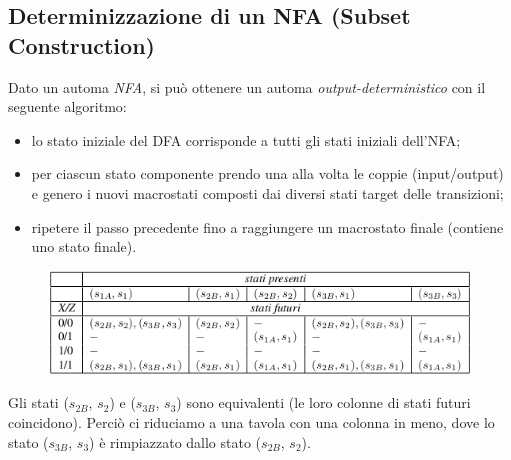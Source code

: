 \documentclass[a4paper, notitlepage, 10pt]{report}
\begin{document}
\subsection*{Determinizzazione di un NFA (Subset Construction)}
Dato un automa \textit{NFA}, si può ottenere un automa \textit{output-deterministico} con il seguente algoritmo:
\begin{itemize}
	\item lo stato iniziale del DFA corrisponde a tutti gli stati iniziali dell'NFA;
	\item per ciascun stato componente prendo una alla volta le coppie (input/output) e genero i nuovi macrostati composti dai diversi stati target delle transizioni;
	\item ripetere il passo precedente fino a raggiungere un macrostato finale (contiene uno stato finale).
\end{itemize}
\begin{multicols}{2}
	\begin{figure}[H]
		\centering
		\includegraphics[scale=0.40]{DetNFA}
	\end{figure}
\columnbreak
\noindent
	Gli stati ($s_{2B}$, $s_2$) e ($s_{3B}$, $s_3$) sono equivalenti (le loro colonne di stati futuri coincidono). Perciò ci riduciamo a una tavola con una colonna in meno, dove lo stato ($s_{3B}$, $s_3$) è rimpiazzato dallo stato ($s_{2B}$, $s_2$).
\end{multicols}
\end{document}
